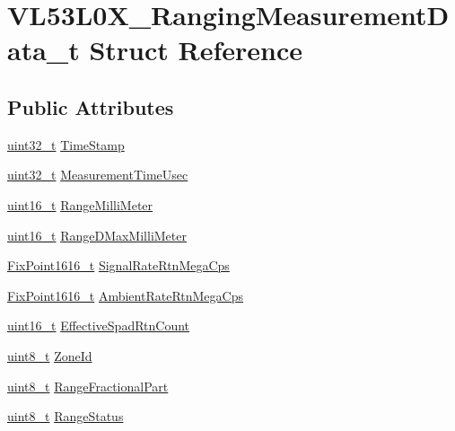 \hypertarget{structVL53L0X__RangingMeasurementData__t}{}\section{V\+L53\+L0\+X\+\_\+\+Ranging\+Measurement\+Data\+\_\+t Struct Reference}
\label{structVL53L0X__RangingMeasurementData__t}
\subsection*{Public Attributes}
\begin{DoxyCompactItemize}
\item 
\hyperlink{vl53l0x__types_8h_a435d1572bf3f880d55459d9805097f62}{uint32\+\_\+t} \hyperlink{structVL53L0X__RangingMeasurementData__t_a3cf44225f58ed787e06210d7d6ba2b85}{Time\+Stamp}
\item 
\hyperlink{vl53l0x__types_8h_a435d1572bf3f880d55459d9805097f62}{uint32\+\_\+t} \hyperlink{structVL53L0X__RangingMeasurementData__t_a5850f47dae332d88bb1cabce5af8d740}{Measurement\+Time\+Usec}
\item 
\hyperlink{vl53l0x__types_8h_a273cf69d639a59973b6019625df33e30}{uint16\+\_\+t} \hyperlink{structVL53L0X__RangingMeasurementData__t_a901b42a39fd3d6f1eca0e1e599142a1b}{Range\+Milli\+Meter}
\item 
\hyperlink{vl53l0x__types_8h_a273cf69d639a59973b6019625df33e30}{uint16\+\_\+t} \hyperlink{structVL53L0X__RangingMeasurementData__t_aef435fbf76dda2e46c2f8ab761186af9}{Range\+D\+Max\+Milli\+Meter}
\item 
\hyperlink{vl53l0x__types_8h_afb910790161809fc76e1a274a6349384}{Fix\+Point1616\+\_\+t} \hyperlink{structVL53L0X__RangingMeasurementData__t_a517834982b944717b56f6840e1e06155}{Signal\+Rate\+Rtn\+Mega\+Cps}
\item 
\hyperlink{vl53l0x__types_8h_afb910790161809fc76e1a274a6349384}{Fix\+Point1616\+\_\+t} \hyperlink{structVL53L0X__RangingMeasurementData__t_afa99e15ec37a360662ab34ccb8929805}{Ambient\+Rate\+Rtn\+Mega\+Cps}
\item 
\hyperlink{vl53l0x__types_8h_a273cf69d639a59973b6019625df33e30}{uint16\+\_\+t} \hyperlink{structVL53L0X__RangingMeasurementData__t_a7d482b02afa5b4d4f6c10e40c6353afc}{Effective\+Spad\+Rtn\+Count}
\item 
\hyperlink{vl53l0x__types_8h_aba7bc1797add20fe3efdf37ced1182c5}{uint8\+\_\+t} \hyperlink{structVL53L0X__RangingMeasurementData__t_a5819f92d725a3dfba7c0897f69ce3fca}{Zone\+Id}
\item 
\hyperlink{vl53l0x__types_8h_aba7bc1797add20fe3efdf37ced1182c5}{uint8\+\_\+t} \hyperlink{structVL53L0X__RangingMeasurementData__t_ab4d8767fcc285173475916e3d6a1045c}{Range\+Fractional\+Part}
\item 
\hyperlink{vl53l0x__types_8h_aba7bc1797add20fe3efdf37ced1182c5}{uint8\+\_\+t} \hyperlink{structVL53L0X__RangingMeasurementData__t_a1178b1f3ba39b69eb7d69289a6e058e8}{Range\+Status}
\end{DoxyCompactItemize}


